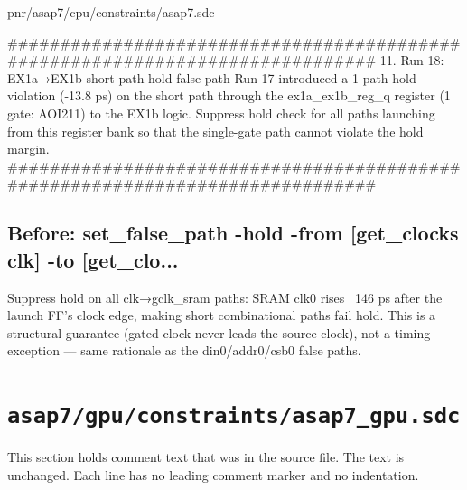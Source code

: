 \begin{relocated}{pnr/asap7/cpu/constraints/asap7.sdc}
\begin{textblock}
##############################################################################
11. Run 18: EX1a→EX1b short-path hold false-path
Run 17 introduced a 1-path hold violation (-13.8 ps) on the short path
through the ex1a_ex1b_reg_q register (1 gate: AOI211) to the EX1b logic.
Suppress hold check for all paths launching from this register bank so
that the single-gate path cannot violate the hold margin.
##############################################################################
\end{textblock}

\subsection*{Before: set\_false\_path -hold -from [get\_clocks clk] -to [get\_clo...}

\begin{textblock}
Suppress hold on all clk→gclk_sram paths: SRAM clk0 rises ~146 ps after
the launch FF's clock edge, making short combinational paths fail hold.
This is a structural guarantee (gated clock never leads the source clock),
not a timing exception — same rationale as the din0/addr0/csb0 false paths.
\end{textblock}

\end{relocated}

\section{\texttt{asap7/gpu/constraints/asap7\_gpu.sdc}}\label{tm:pd:asap7-gpu-sdc}

This section holds comment text that was in the source file. The text is unchanged. Each line has no leading comment marker and no indentation.

